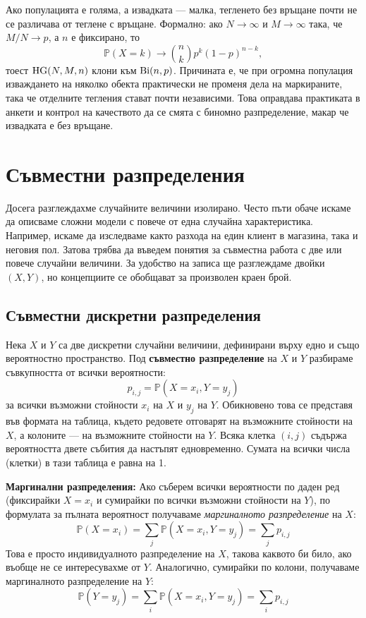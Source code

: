 \begin{supp}\label{supp:hg-to-bin}
Ако популацията е голяма, а извадката — малка, тегленето без връщане почти не се различава
от теглене с връщане. Формално: ако $N \to \infty$ и $M \to \infty$ така, че
$M/N \to p$, а $n$ е фиксирано, то
\[ \mathbb{P}(X = k) \longrightarrow \binom{n}{k} p^k (1-p)^{n-k}, \]
тоест $\operatorname{HG}(N,M,n)$ клони към $\operatorname{Bi}(n,p)$. Причината е, че при огромна популация
изваждането на няколко обекта практически не променя дела на маркираните, така че
отделните тегления стават почти независими. Това оправдава практиката в анкети и контрол
на качеството да се смята с биномно разпределение, макар че извадката е без връщане.
\end{supp}

\section{Съвместни разпределения}

Досега разглеждахме случайните величини изолирано. Често пъти обаче искаме да описваме сложни модели с повече от една случайна характеристика. Например, искаме да изследваме както разхода на един клиент в магазина, така и неговия пол. Затова трябва да въведем понятия за съвместна работа с две или повече случайни величини. За удобство на записа ще разглеждаме двойки $(X, Y)$, но концепциите се обобщават за произволен краен брой.

\subsection{Съвместни дискретни разпределения}

\begin{defn}
Нека $X$ и $Y$ са две дискретни случайни величини, дефинирани върху едно и също вероятностно пространство. Под \textbf{съвместно разпределение} на $X$ и $Y$ разбираме съвкупността от всички вероятности:
\[
p_{i,j} = \mathbb{P}(X = x_i, Y = y_j)
\]
за всички възможни стойности $x_i$ на $X$ и $y_j$ на $Y$. Обикновено това се представя във формата на таблица, където редовете отговарят на възможните стойности на $X$, а колоните — на възможните стойности на $Y$. Всяка клетка $(i, j)$ съдържа вероятността двете събития да настъпят едновременно. Сумата на всички числа (клетки) в тази таблица е равна на 1.
\end{defn}

\textbf{Маргинални разпределения:}
Ако съберем всички вероятности по даден ред (фиксирайки $X = x_i$ и сумирайки по всички възможни стойности на $Y$), по формулата за пълната вероятност получаваме \emph{маргиналното разпределение} на $X$:
\[
\mathbb{P}(X = x_i) = \sum_{j} \mathbb{P}(X = x_i, Y = y_j) = \sum_{j} p_{i,j}
\]
Това е просто индивидуалното разпределение на $X$, такова каквото би било, ако въобще не се интересувахме от $Y$. Аналогично, сумирайки по колони, получаваме маргиналното разпределение на $Y$:
\[
\mathbb{P}(Y = y_j) = \sum_{i} \mathbb{P}(X = x_i, Y = y_j) = \sum_{i} p_{i,j}
\]

